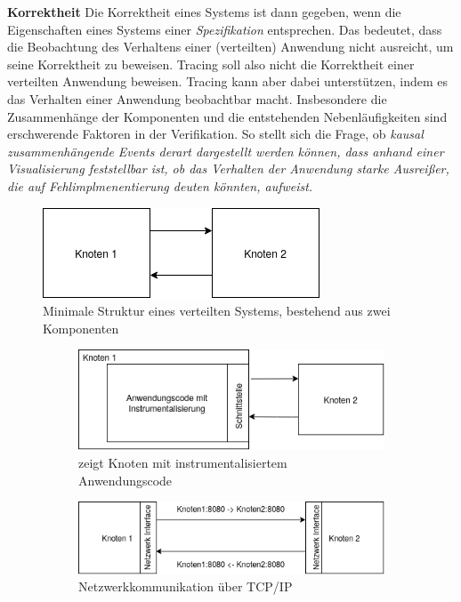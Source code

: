 \textbf{Korrektheit} \space\space\space Die Korrektheit eines Systems ist dann gegeben, wenn die Eigenschaften eines Systems einer \emph{Spezifikation} entsprechen. Das bedeutet, dass die Beobachtung des Verhaltens einer (verteilten) Anwendung nicht ausreicht, um seine Korrektheit zu beweisen. Tracing soll also nicht die Korrektheit einer verteilten Anwendung beweisen. Tracing kann aber dabei unterstützen, indem es das Verhalten einer Anwendung beobachtbar macht. Insbesondere die Zusammenhänge der Komponenten und die entstehenden Nebenläufigkeiten sind erschwerende Faktoren in der Verifikation. So stellt sich die Frage, ob \emph{kausal zusammenhängende Events derart dargestellt werden können, dass anhand einer Visualisierung feststellbar ist, ob das Verhalten der Anwendung starke Ausreißer, die auf Fehlimplmenentierung deuten könnten, aufweist.}

\begin{figure}[!ht]
	\centering
	\includegraphics[scale=0.5]{img/Problembeschreibung/distributed_system_application_minimal.png}
	\caption[Minimale Struktur eines verteilten Systems]{Minimale Struktur eines verteilten Systems, bestehend aus zwei Komponenten}
	\label{fig:distributed_system_application_minimal}
\end{figure}
\begin{figure}[!ht]
	\centering
	\begin{subfigure}[t]{.49\linewidth}
		\centering\includegraphics[width=0.9\linewidth]{img/Problembeschreibung/distributed_system_application_inside.png}
		\caption[Abbildung]{zeigt Knoten mit instrumentalisiertem Anwendungscode}
		\label{fig:distributed_system_application_inside}
	\end{subfigure}
	\begin{subfigure}[t]{.49\linewidth}
		\centering\includegraphics[width=\linewidth]{img/Problembeschreibung/distributed_system_network.png}
		\caption[Abbildung]{Netzwerkkommunikation über TCP/IP}
		\label{fig:distributed_system_network}
	\end{subfigure}
	\caption[Anwendungsinstrumentalisierung und Netzwerkkommunikation über TCP/IP in verteilten Systemen]{}
\end{figure} 


